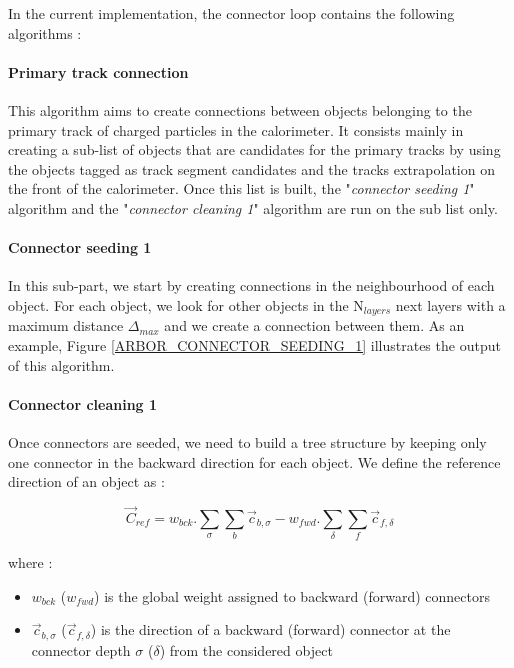 \documentclass[cits]{JINST}
\begin{document}
In the current implementation, the connector loop contains the following algorithms :

\paragraph*{Primary track connection} This algorithm aims to create connections between objects belonging to the primary track of charged particles in the calorimeter. It consists mainly in creating a sub-list of objects that are candidates for the primary tracks by using the objects tagged as track segment candidates and the tracks extrapolation on the front of the calorimeter. Once this list is built, the "\textit{connector seeding 1}" algorithm and the "\textit{connector cleaning 1}" algorithm are run on the sub list only. 

\paragraph*{Connector seeding 1} In this sub-part, we start by creating connections in the neighbourhood of each object. For each object, we look for other objects in the N$_{layers}$ next layers with a maximum distance $\Delta_{max}$ and we create a connection between them. As an example, Figure \ref{ARBOR_CONNECTOR_SEEDING_1} illustrates the output of this algorithm.

\paragraph*{Connector cleaning 1} Once connectors are seeded, we need to build a tree structure by keeping only one connector in the backward direction for each object. We define the reference direction of an object as :

\begin{equation}
  \vec{C}_{ref} = w_{bck} . \sum_\sigma \sum_b \vec{c}_{b,\sigma} - w_{fwd} . \sum_\delta \sum_f \vec{c}_{f,\delta}
\end{equation}

where :

\begin{itemize}
  \item $w_{bck}$ ($w_{fwd}$) is the global weight assigned to backward (forward) connectors
  \item $\vec{c}_{b,\sigma}$ ($\vec{c}_{f,\delta}$) is the direction of a backward (forward) connector at the connector depth $\sigma$ ($\delta$) from the considered object
\end{itemize}
\end{document}
